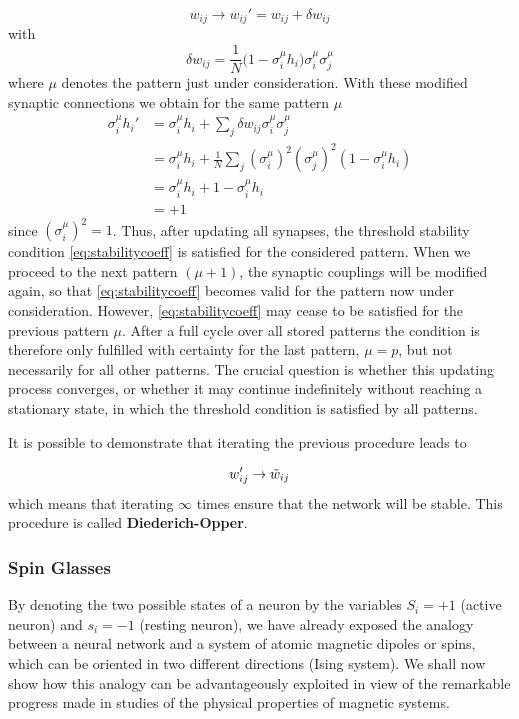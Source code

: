 \begin{equation}
    w_{ij}\rightarrow w_{ij}'=w_{ij}+\delta w_{ij}
\end{equation}
with
\begin{equation}
    \delta w_{ij}=\frac{1}{N}\big(1-\sigma_{i}^{\mu} h_{i}\big)\sigma_{i}^{\mu}\sigma_{j}^{\mu}
\end{equation}
where $\mu$ denotes the pattern just under consideration.  With these modified
synaptic connections we obtain for the same pattern $\mu$
\begin{equation}
    \begin{split}
        \sigma_{i}^{\mu}h_{i}'&=\sigma_{i}^{\mu}h_{i}+\sum_{j}\delta w_{ij}\sigma_{i}^{\mu}\sigma_{j}^{\mu}\\
        &=\sigma_{i}^{\mu}h_{i}+\frac{1}{N} \sum_{j}(\sigma_{i}^{\mu})^2(\sigma_{j}^{\mu})^2(1-\sigma_{i}^{\mu}h_{i})\\
        &=\sigma_{i}^{\mu}h_{i}+1-\sigma_{i}^{\mu}h_{i}\\
        &=+1
    \end{split}
\end{equation}
since $(\sigma_{i}^{\mu})^2 = 1$. Thus, after updating all synapses, the threshold stability condition \ref{eq:stabilitycoeff} is satisfied for the considered pattern. When we proceed to the next pattern $(\mu + 1)$, the synaptic couplings will be modified again, so that  \ref{eq:stabilitycoeff} becomes valid for the pattern now under consideration. However,  \ref{eq:stabilitycoeff} may cease to be satisfied for the previous pattern $\mu$. After a full cycle over all stored patterns the condition is therefore only fulfilled with certainty for the last pattern, $\mu = p$, but not necessarily for all other patterns. The crucial question is whether this updating process converges, or whether it
may continue indefinitely without reaching a stationary state, in which the threshold condition is satisfied by all patterns.

It is possible to demonstrate that iterating the previous procedure leads to

\begin{equation}
    w_{ij}' \rightarrow \Tilde{w}_{ij}
\end{equation}
 which means that iterating $\infty$ times ensure that the network will be stable.
This procedure is called \textbf{Diederich-Opper}.


\subsubsection{Spin Glasses}\label{sec:Spinglasses}
By denoting the two possible states of a neuron by the variables $S_i = +1$ (active neuron) and $s_i = -1$ (resting neuron), we have already exposed the analogy between a neural network and a system of atomic magnetic dipoles or spins, which can be oriented in two different directions (Ising system). We shall now show how this analogy can be advantageously exploited in view of the remarkable progress made in studies of the physical properties of magnetic systems.

